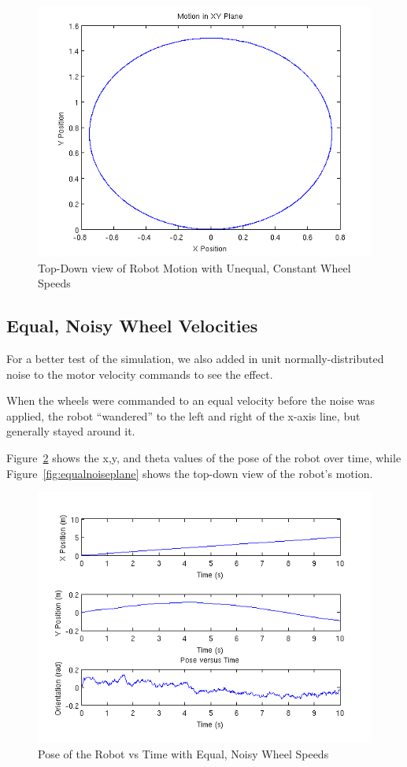 \documentclass[10pt]{article}
\begin{document}
\begin{figure}[h]
 \centering
 \includegraphics[scale=0.55,keepaspectratio=true]{unequalconstantplane.png}
 \caption{Top-Down view of Robot Motion with Unequal, Constant Wheel Speeds}
 \label{fig:unequalconstantplane}
\end{figure}

\newpage
\subsection{Equal, Noisy Wheel Velocities}
For a better test of the simulation, we also added in unit normally-distributed noise to the motor velocity commands to see the effect.

When the wheels were commanded to an equal velocity before the noise was applied, the robot ``wandered'' to the left and right of the x-axis line, but generally stayed around it.

Figure~\ref{fig:equalnoisepose} shows the x,y, and theta values of the pose of the robot over time, while Figure~\ref{fig:equalnoiseplane} shows the top-down view of the robot's motion.

\begin{figure}[h]
 \centering
 \includegraphics[scale=0.55,keepaspectratio=true]{equalnoisepose.png}
 \caption{Pose of the Robot vs Time with Equal, Noisy Wheel Speeds}
 \label{fig:equalnoisepose}
\end{figure}
\end{document}
